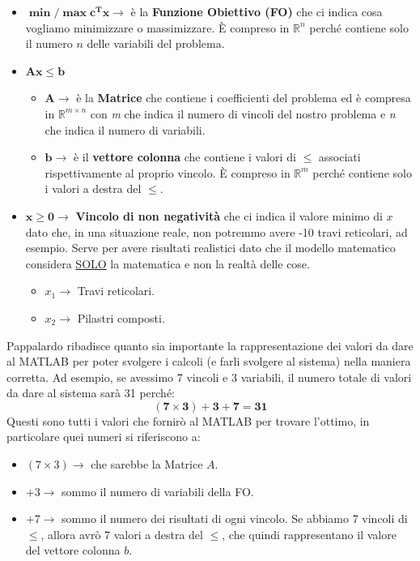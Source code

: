 \documentclass[12pt, a4paper]{article}
\begin{document}
	\begin{itemize}[label=\textcolor{titlecolor}{\Large\textbullet}, itemsep=4pt, leftmargin=1.5cm]
		\item $\boldsymbol{\min/\max c^Tx} \rightarrow$ è la \textbf{Funzione Obiettivo (FO)} che ci indica cosa vogliamo minimizzare o massimizzare. È compreso in $\mathbb{R}^n$ perché contiene solo il numero $n$ delle variabili del problema.
		
		\item $\boldsymbol{Ax \leq b}$
		\begin{itemize}[label=$\circ$, itemsep=2pt]
			\item $\mathbf{A} \rightarrow$ è la \textbf{Matrice} che contiene i coefficienti del problema ed è compresa in $\mathbb{R}^{m \times n}$ con \textit{m} che indica il numero di vincoli del nostro problema e \textit{n} che indica il numero di variabili.
			\item $\mathbf{b} \rightarrow$ è il \textbf{vettore colonna} che contiene i valori di $\leq$ associati rispettivamente al proprio vincolo. È compreso in $\mathbb{R}^m$ perché contiene solo i valori a destra del $\leq$.
		\end{itemize}
		
		\item $\boldsymbol{x \geq 0} \rightarrow$ \textbf{Vincolo di non negatività} che ci indica il valore minimo di $x$ dato che, in una situazione reale, non potremmo avere -10 travi reticolari, ad esempio. Serve per avere risultati realistici dato che il modello matematico considera \underline{SOLO} la matematica e non la realtà delle cose.
		\begin{itemize}[label=$\circ$, itemsep=2pt]
			\item $x_1 \rightarrow$ Travi reticolari.
			\item $x_2 \rightarrow$ Pilastri composti.
		\end{itemize}
	\end{itemize}
	
	Pappalardo ribadisce quanto sia importante la rappresentazione dei valori da dare al MATLAB per poter svolgere i calcoli (e farli svolgere al sistema) nella maniera corretta. Ad esempio, se avessimo 7 vincoli e 3 variabili, il numero totale di valori da dare al sistema sarà 31 perché:
	\[ \mathbf{(7 \times 3) + 3 + 7 = 31} \]
	Questi sono tutti i valori che fornirò al MATLAB per trovare l'ottimo, in particolare quei numeri si riferiscono a:
	\begin{itemize}[label=-, itemsep=2pt, leftmargin=2cm]
		\item $(7 \times 3) \rightarrow$ che sarebbe la Matrice $A$.
		\item $+ 3 \rightarrow$ sommo il numero di variabili della FO.
		\item $+ 7 \rightarrow$ sommo il numero dei risultati di ogni vincolo. Se abbiamo 7 vincoli di $\leq$, allora avrò 7 valori a destra del $\leq$, che quindi rappresentano il valore del vettore colonna $b$.
	\end{itemize}
	
\end{document}
